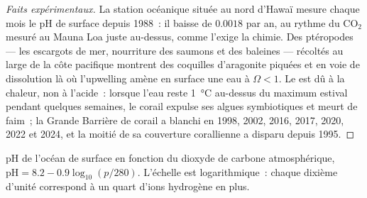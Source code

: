 \begin{proof}[Faits expérimentaux]
La station océanique située au nord d'Hawaï mesure chaque mois le pH de
surface depuis 1988~: il baisse de $0.0018$ par an, au rythme du
\ensuremath{\mathrm{CO_2}} mesuré au Mauna Loa juste au-dessus, comme l'exige la chimie.
Des ptéropodes --- les escargots de mer, nourriture des saumons et des
baleines --- récoltés au large de la côte pacifique montrent des
coquilles d'aragonite piquées et en voie de dissolution là où l'upwelling
amène en surface une eau à $\Omega <
1$. Le  est dû à la chaleur, non à l'acide~:
lorsque l'eau reste \qty{1}{\celsius} au-dessus du maximum estival
pendant quelques semaines, le corail expulse ses algues symbiotiques et
meurt de faim~; la Grande Barrière de corail a blanchi en 1998, 2002,
2016, 2017, 2020, 2022 et 2024, et la moitié de sa couverture corallienne
a disparu depuis 1995.
\end{proof}

\begin{omfigure}

{\small pH de l'océan de surface en fonction du dioxyde de carbone
atmosphérique,
$\mathrm{pH} = 8.2 - 0.9\log_{10}(p/280)$. L'échelle est
logarithmique~: chaque dixième d'unité correspond à un quart d'ions
hydrogène en plus.}
\end{omfigure}

